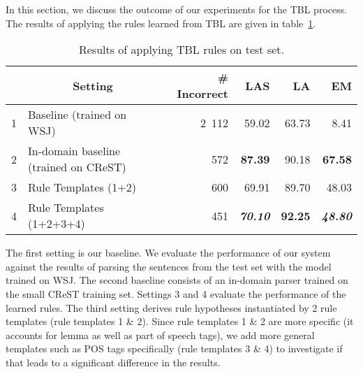 In this section, we discuss the outcome of our experiments for the TBL process. The results of applying the rules learned from TBL are given in table~\ref{tab:overall}.


\begin{table}[t]
\centering
\begin{tabular}{l|l|r|rrr|}
 & \multicolumn{1}{c|}{Setting} & \# Incorrect  & LAS & LA & EM \\ \hline
1 & Baseline (trained on WSJ) & 2~112 & 59.02  & 63.73 & 8.41  \\
2 & In-domain baseline (trained on CReST)& 572 & \textbf{87.39}  & 90.18 & \textbf{67.58}   \\
3 & Rule Templates (1+2) & 600 & 69.91  & 89.70 & 48.03 \\
4 & Rule Templates (1+2+3+4) & {451} &{\textbf{\textit{70.10}}} &
{\textbf{92.25}} & {\textbf{\textit{48.80}}}  \\
\hline
\end{tabular}%
\caption{Results of applying TBL rules on test set.}
\label{tab:overall}
\end{table}


The first setting is our baseline. We evaluate the performance of our system against the results of parsing the sentences from the test set with the model trained on WSJ. The second baseline consists of an in-domain parser trained on the small CReST training set. Settings 3 and 4 evaluate the performance of the learned rules. The third setting derives rule hypotheses instantiated by 2 rule templates (rule templates 1 \& 2). Since rule templates 1 \& 2 are more specific (it accounts for lemma as well as part of speech tags), we add more general templates such as POS tags specifically (rule templates 3 \& 4) to investigate if that leads to a significant difference in the results. %

